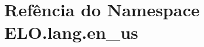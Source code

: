 \hypertarget{namespaceELO_1_1lang_1_1en__us}{\section{Refência do Namespace E\-L\-O.\-lang.\-en\-\_\-us}
\label{namespaceELO_1_1lang_1_1en__us}
}
